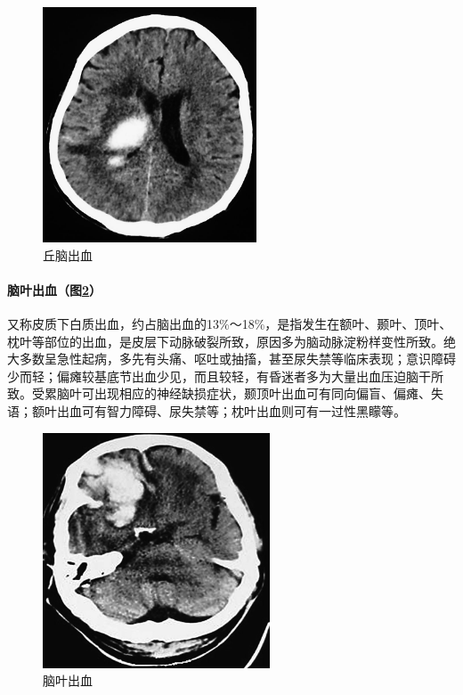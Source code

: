 \begin{figure}[!htbp]
 \centering
 \includegraphics[width=2.5in,height=2.75in]{./images/Image00378.jpg}
 \captionsetup{justification=centering}
 \caption{丘脑出血}
 \label{fig84-3}
  \end{figure} 

\paragraph{脑叶出血（图\ref{fig84-4}）}

又称皮质下白质出血，约占脑出血的13\%～18\%，是指发生在额叶、颞叶、顶叶、枕叶等部位的出血，是皮层下动脉破裂所致，原因多为脑动脉淀粉样变性所致。绝大多数呈急性起病，多先有头痛、呕吐或抽搐，甚至尿失禁等临床表现；意识障碍少而轻；偏瘫较基底节出血少见，而且较轻，有昏迷者多为大量出血压迫脑干所致。受累脑叶可出现相应的神经缺损症状，颞顶叶出血可有同向偏盲、偏瘫、失语；额叶出血可有智力障碍、尿失禁等；枕叶出血则可有一过性黑矇等。

\begin{figure}[!htbp]
 \centering
 \includegraphics[width=2.65625in,height=2.75in]{./images/Image00379.jpg}
 \captionsetup{justification=centering}
 \caption{脑叶出血}
 \label{fig84-4}
  \end{figure} 

